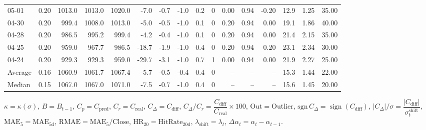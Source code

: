 \begin{threeparttable}
{\begin{tabular}{lrrrrrrrrrrrrrrr}
  05-01 &     0.20 & 1013.0 & 1013.0 & 1020.0 &       -7.0 &           -0.7 &                     -1.0 &                 0.2 &              0 &       0.00 &      0.94 &          -0.20 &             12.9 &            1.25 &                  35.00 \\
  04-30 &     0.20 &  999.4 & 1008.0 & 1013.0 &       -5.0 &           -0.5 &                     -1.0 &                 0.1 &              0 &       0.20 &      0.94 &           0.00 &             19.1 &            1.86 &                  40.00 \\
  04-28 &     0.20 &  986.5 &  995.2 &  999.4 &       -4.2 &           -0.4 &                     -1.0 &                 0.1 &              0 &       0.20 &      0.94 &           0.00 &             21.4 &            2.15 &                  35.00 \\
  04-25 &     0.20 &  959.0 &  967.7 &  986.5 &      -18.7 &           -1.9 &                     -1.0 &                 0.4 &              0 &       0.20 &      0.94 &           0.20 &             23.1 &            2.34 &                  30.00 \\
  04-24 &     0.20 &  929.3 &  929.3 &  959.0 &      -29.7 &           -3.1 &                     -1.0 &                 0.7 &              1 &       0.00 &      0.94 &           0.00 &             21.9 &            2.27 &                  25.00 \\
Average &     0.16 & 1060.9 & 1061.7 & 1067.4 &       -5.7 &           -0.5 &                     -0.4 &                 0.4 &              0 &         -- &        -- &             -- &             15.3 &            1.44 &                  22.00 \\
 Median &     0.15 & 1067.0 & 1067.0 & 1071.0 &       -7.5 &           -0.7 &                     -1.0 &                 0.4 &              0 &         -- &        -- &             -- &             15.6 &            1.45 &                  20.00 \\
\bottomrule
\end{tabular}
}
\begin{tablenotes}\footnotesize
\item $\kappa=\kappa(\sigma)$, $B=B_{t-1}$, $C_p=C_{\text{pred}}$, $C_r=C_{\text{real}}$, $C_\Delta=C_{\text{diff}}$, $C_\Delta/C_r=\dfrac{C_{\text{diff}}}{C_{\text{real}}}\times100$, $\mathrm{Out}=\text{Outlier}$, $\mathrm{sgn}\,C_\Delta=\operatorname{sign}(C_{\text{diff}})$, $|C_\Delta|/\sigma=\dfrac{|C_{\text{diff}}|}{\sigma_t^{\text{shift}}}$, $\mathrm{MAE}_5=\mathrm{MAE}_{5\text{d}}$, $\mathrm{RMAE}= \mathrm{MAE}_5 / \text{Close}$, $\mathrm{HR}_{20}=\mathrm{HitRate}_{20\text{d}}$, 
$\lambda_{\text{shift}}=\lambda_t$, 
$\Delta\alpha_t=\alpha_t-\alpha_{t-1}$.
\end{tablenotes}
\end{threeparttable}
\endgroup

